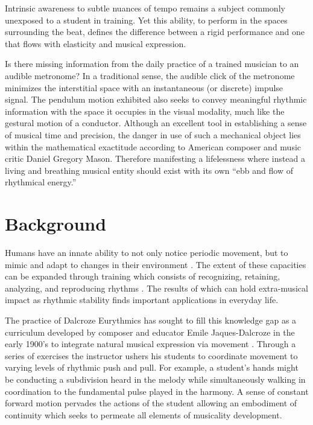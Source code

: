 Intrinsic awareness to subtle nuances of tempo remains a subject commonly unexposed to a student in training. Yet this ability, to perform in the spaces surrounding the beat, defines the difference between a rigid performance and one that flows with elasticity and musical expression.

Is there missing information from the daily practice of a trained musician to an audible metronome? In a traditional sense, the audible click of the metronome minimizes the interstitial space with an instantaneous (or discrete) impulse signal. The pendulum motion exhibited also seeks to convey meaningful rhythmic information with the space it occupies in the visual modality, much like the gestural motion of a conductor. Although an excellent tool in establishing a sense of musical time and precision, the danger in use of such a mechanical object lies within the mathematical exactitude according to American composer and music critic Daniel Gregory Mason. Therefore manifesting a lifelessness where instead a living and breathing musical entity should exist with its own ``ebb and flow of rhythmical energy.''\cite{fitts2008new}

\section{Background}
Humans have an innate ability to not only notice periodic movement, but to mimic and adapt to changes in their environment \cite{clayton2005time}. The extent of these capacities can be expanded through training which consists of recognizing, retaining, analyzing, and reproducing rhythms \cite{holland2010feeling}. The results of which can hold extra-musical impact as rhythmic stability finds important applications in everyday life.

The practice of Dalcroze Eurythmics has sought to fill this knowledge gap as a curriculum developed by composer and educator Emile Jaques-Dalcroze in the early 1900's to integrate natural musical expression via movement \cite{jaques1930eurhythmics}. Through a series of exercises the instructor ushers his students to coordinate movement to varying levels of rhythmic push and pull. For example, a student's hands might be conducting a subdivision heard in the melody while simultaneously walking in coordination to the fundamental pulse played in the harmony. A sense of constant forward motion pervades the actions of the student allowing an embodiment of continuity which seeks to permeate all elements of musicality development.

